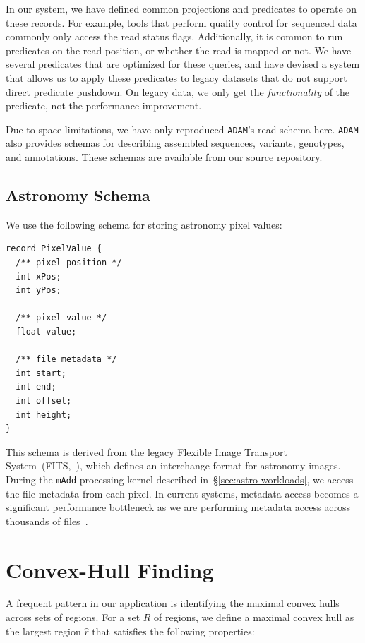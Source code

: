 \documentclass{acm_proc_article-sp}
\begin{document}
In our system, we have defined common projections and predicates to operate on these records. For
example, tools that perform quality control for sequenced data commonly only access the read status flags.
Additionally, it is common to run predicates on the read position,
or whether the read is mapped or not. We have several predicates that are optimized for these queries,
and have devised a system that allows us to apply these predicates to legacy datasets that do not support
direct predicate pushdown. On legacy data, we only get the \emph{functionality} of the predicate, not the
performance improvement.

Due to space limitations, we have only reproduced \texttt{ADAM}'s read schema here. \texttt{ADAM} also provides
schemas for describing assembled sequences, variants, genotypes, and annotations. These schemas are
available from our source repository.

\subsection{Astronomy Schema}
\label{sec:astronomy-schema}

We use the following schema for storing astronomy pixel values:

\begin{lstlisting}
record PixelValue {
  /** pixel position */
  int xPos;
  int yPos;
  
  /** pixel value */
  float value;
  
  /** file metadata */
  int start;
  int end;
  int offset;
  int height;
}
\end{lstlisting}

This schema is derived from the legacy Flexible Image Transport System~(FITS,~\cite{wells81}), which
defines an interchange format for astronomy images. During the \texttt{mAdd} processing kernel
described in~\S\ref{sec:astro-workloads}, we access the file metadata from each pixel. In current systems,
metadata access becomes a significant performance bottleneck as we are performing metadata access
across thousands of files~\cite{zhang13}.

\section{Convex-Hull Finding}
\label{sec:convex-hull}

A frequent pattern in our application is identifying the maximal convex hulls across sets of regions. For
a set $R$ of regions, we define a maximal convex hull as the largest region $\hat{r}$ that satisfies the
following properties:
\end{document}
